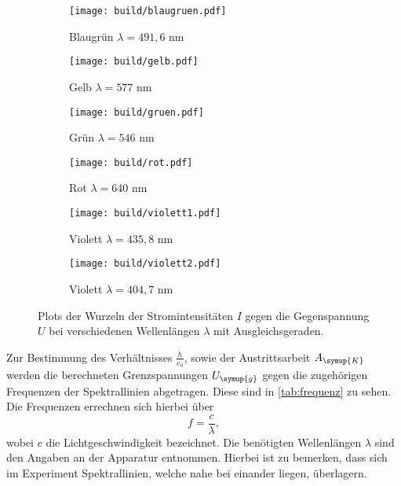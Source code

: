 \begin{figure}
  \centering
  \begin{subfigure}{0.49\textwidth}
    \centering
    \texttt{[image: build/blaugruen.pdf]}
    \caption{Blaugrün $\lambda = 491,6$ nm}
  \end{subfigure}
  \begin{subfigure}{0.49\textwidth}
    \centering
    \texttt{[image: build/gelb.pdf]}
    \caption{Gelb $\lambda = 577$ nm}
  \end{subfigure}

  \begin{subfigure}{0.49\textwidth}
    \centering
    \texttt{[image: build/gruen.pdf]}
    \caption{Grün $\lambda = 546$ nm}
  \end{subfigure}
  \begin{subfigure}{0.49\textwidth}
    \centering
    \texttt{[image: build/rot.pdf]}
    \caption{Rot $\lambda = 640$ nm}
  \end{subfigure}

  \begin{subfigure}{0.49\textwidth}
    \centering
    \texttt{[image: build/violett1.pdf]}
    \caption{Violett $\lambda = 435,8$ nm}
  \end{subfigure}
  \begin{subfigure}{0.49\textwidth}
    \centering
    \texttt{[image: build/violett2.pdf]}
    \caption{Violett $\lambda = 404,7$ nm}
  \end{subfigure}
  \caption{Plots der Wurzeln der Stromintensitäten $I$ gegen die Gegenspannung $U$ bei verschiedenen Wellenlängen $\lambda$ mit Ausgleichsgeraden.}
  \label{fig:farben}
\end{figure}


Zur Bestimmung des Verhältnisses $\frac{h}{e_0}$, sowie der Austrittsarbeit $A_{\symup{K}}$ werden die berechneten Grenzspannungen $U_{\symup{g}}$
gegen die zugehörigen Frequenzen der Spektrallinien abgetragen. Diese sind in \autoref{tab:frequenz} zu sehen. Die Frequenzen errechnen sich hierbei über 
\begin{equation}
\label{eqn:frequenz}
  f = \frac{c}{\lambda},
\end{equation}  
wobei $c$ die Lichtgeschwindigkeit bezeichnet. Die benötigten Wellenlängen $\lambda$ sind den Angaben an der Apparatur entnommen. Hierbei ist zu bemerken, dass sich im Experiment Spektrallinien, welche nahe bei einander liegen, überlagern.
